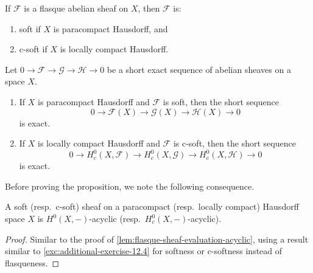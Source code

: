 \begin{cor}
If \(\mathcal F\) is a flasque abelian sheaf on \(X\), then \(\mathcal F\) is:
\begin{enumerate}
\item soft if \(X\) is paracompact Hausdorff, and
\item c-soft if \(X\) is locally compact Hausdorff.
\end{enumerate}
\end{cor}

\begin{prop}\label{prop:global-sections-exact-soft}
Let \(0\to\mathcal F\to\mathcal G\to\mathcal H\to 0\) be a short exact sequence of abelian sheaves on a space \(X\).
\begin{enumerate}
\item\label{prop:global-sections-exact-soft:soft}
  If \(X\) is paracompact Hausdorff and \(\mathcal F\) is soft, then the short sequence
  \[ 0\to\mathcal F(X)\to\mathcal G(X)\to\mathcal H(X)\to 0 \]
  is exact.
\item\label{prop:global-sections-exact-soft:c-soft}
  If \(X\) is locally compact Hausdorff and \(\mathcal F\) is c-soft, then the short sequence
  \[ 0\to H^0_c(X,\mathcal F)\to H^0_c(X,\mathcal G)\to H^0_c(X,\mathcal H)\to 0 \]
  is exact.
\end{enumerate}
\end{prop}

Before proving the proposition, we note the following consequence.

\begin{cor}
A soft (resp.~c-soft) sheaf on a paracompact (resp.~locally compact) Hausdorff space \(X\) is \(H^0(X,-)\)-acyclic (resp.~\(H^0_c(X,-)\)-acyclic).
\end{cor}
\begin{proof}
Similar to the proof of \cref{lem:flasque-sheaf-evaluation-acyclic}, using a result similar to \cref{exc:additional-exercise-12.4} for softness or c-softness instead of flasqueness.
\end{proof}

